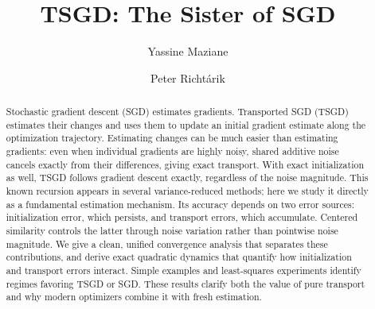 \documentclass[11pt]{article}
\title{TSGD: The Sister of SGD}
\author{Yassine Maziane \and Peter Richt\'arik}
\date{}
\begin{document}
\maketitle

\begin{abstract}
Stochastic gradient descent (SGD) estimates gradients. Transported SGD
(TSGD) estimates their changes and uses them to update an initial gradient
estimate along the optimization trajectory. Estimating changes can be
much easier than estimating gradients: even when individual gradients
are highly noisy, shared additive noise cancels exactly from their
differences, giving exact transport. With exact initialization as well,
TSGD follows gradient descent exactly, regardless of the noise magnitude.
This known recursion appears in several variance-reduced methods; here
we study it directly as a fundamental estimation mechanism.
Its accuracy depends on two error sources: initialization error,
which persists, and transport errors, which accumulate. Centered
similarity controls the latter through noise variation rather than
pointwise noise magnitude. We give a clean, unified convergence analysis
that separates these contributions, and derive exact quadratic dynamics
that quantify how initialization and transport errors interact.
Simple examples and least-squares experiments identify regimes
favoring TSGD or SGD. These results clarify both the value of pure
transport and why modern optimizers combine it with fresh estimation.
\end{abstract}







\label{main-text-end}

\clearpage



\appendix





\end{document}
